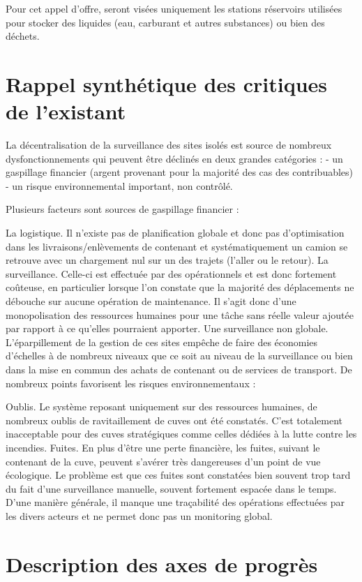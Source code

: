 \documentclass[a4paper]{article}
\begin{document}
Pour cet appel d'offre, seront visées uniquement les stations réservoirs utilisées pour stocker des liquides (eau, carburant et autres substances) ou bien des déchets.

\section{Rappel synthétique des critiques de l’existant}

La décentralisation de la surveillance des sites isolés est source de nombreux dysfonctionnements qui peuvent être déclinés en deux grandes catégories : - un gaspillage financier (argent provenant pour la majorité des cas des contribuables) - un risque environnemental important, non contrôlé.

Plusieurs facteurs sont sources de gaspillage financier :

La logistique. Il n'existe pas de planification globale et donc pas d'optimisation dans les livraisons/enlèvements de contenant et systématiquement un camion se retrouve avec un chargement nul sur un des trajets (l'aller ou le retour).
La surveillance. Celle-ci est effectuée par des opérationnels et est donc fortement coûteuse, en particulier lorsque l'on constate que la majorité des déplacements ne débouche sur aucune opération de maintenance. Il s'agit donc d'une monopolisation des ressources humaines pour une tâche sans réelle valeur ajoutée par rapport à ce qu'elles pourraient apporter.
Une surveillance non globale. L'éparpillement de la gestion de ces sites empêche de faire des économies d'échelles à de nombreux niveaux que ce soit au niveau de la surveillance ou bien dans la mise en commun des achats de contenant ou de services de transport.
De nombreux points favorisent les risques environnementaux :

Oublis. Le système reposant uniquement sur des ressources humaines, de nombreux oublis de ravitaillement de cuves ont été constatés. C'est totalement inacceptable pour des cuves stratégiques comme celles dédiées à la lutte contre les incendies.
Fuites. En plus d'être une perte financière, les fuites, suivant le contenant de la cuve, peuvent s'avérer très dangereuses d'un point de vue écologique. Le problème est que ces fuites sont constatées bien souvent trop tard du fait d'une surveillance manuelle, souvent fortement espacée dans le temps.
D'une manière générale, il manque une traçabilité des opérations effectuées par les divers acteurs et ne permet donc pas un monitoring global.

\section{Description des axes de progrès}
\end{document}
